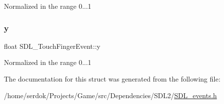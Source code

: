 Normalized in the range 0...1 \mbox{\label{structSDL__TouchFingerEvent_ac2bb8af638d2927a8e13f6ffe8f9384e}} 
\subsubsection{\texorpdfstring{y}{y}}
{\footnotesize\ttfamily float S\+D\+L\+\_\+\+Touch\+Finger\+Event\+::y}

Normalized in the range 0...1 

The documentation for this struct was generated from the following file\+:\begin{DoxyCompactItemize}
\item 
/home/serdok/\+Projects/\+Game/src/\+Dependencies/\+S\+D\+L2/\hyperlink{SDL__events_8h}{S\+D\+L\+\_\+events.\+h}\end{DoxyCompactItemize}
